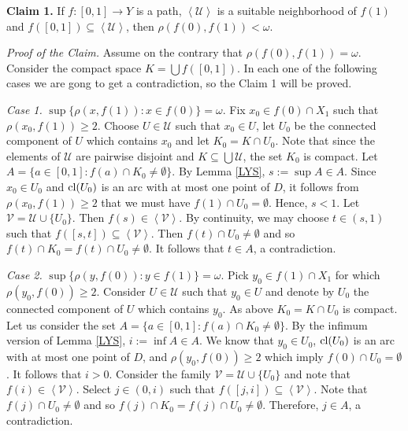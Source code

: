 \documentclass[11pt]{amsart}
\numberwithin{equation}{section}
\theoremstyle{plain}
\theoremstyle{definition}
\theoremstyle{definition}
\theoremstyle{definition}
\theoremstyle{definition}
\theoremstyle{definition}
\begin{document}
\textbf{Claim 1.} If $f : [0,1] \to Y$ is a path,  $\left\langle \mathcal{U}\right\rangle$ is a suitable neighborhood of $f(1)$ and $f([0,1]) \subseteq \left\langle \mathcal{U}\right\rangle$, then $\rho(f(0),f(1)) < \omega$.\medskip

\textit{Proof of the Claim.} Assume on the contrary that $\rho(f(0),f(1)) = \omega$. Consider the compact space  $K = \bigcup f([0,1])$.  In each one of the following cases we are gong to get a contradiction, so the Claim 1 will be proved.

\textit{Case 1.} $\sup\{\rho(x,f(1)) : x \in f(0)\} = \omega$. Fix $x_0 \in f(0) \cap X_1$ such that $\rho(x_0,f(1)) \geq 2$. Choose $U \in \mathcal{U}$ such that $x_0 \in U$, let $U_0$ be the connected component of $U$ which contains $x_0$ and let $K_0 = K \cap U_0$. Note that since the elements of $\mathcal{U}$ are pairwise  disjoint and $K \subseteq \bigcup \mathcal{U}$, the set $K_0$ is compact. Let $A = \{a \in [0,1] : f(a) \cap K_0 \not = \emptyset\}$. By Lemma \ref{LYS}, $s := \sup A \in A$. Since $x_0 \in U_0$ and $\textnormal{cl}(U_0)$ is an arc with at most one point of $D$, it follows from $\rho(x_0,f(1)) \geq 2$ that we must have $f(1) \cap U_0 = \emptyset$. Hence, $s < 1$. Let $\mathcal{V} = \mathcal{U} \cup \{U_0\}$. Then $f(s) \in \left\langle \mathcal{V}\right\rangle$. By continuity, we may choose $t \in (s,1)$ such that $f([s,t]) \subseteq \left\langle \mathcal{V}\right\rangle$. Then $f(t) \cap U_0 \not=\emptyset$ and so $f(t) \cap K_0 = f(t) \cap U_0 \not= \emptyset$. It follows that $t \in A$, a contradiction.

\smallskip

\textit{Case 2.} $\sup\{\rho(y,f(0)) : y \in f(1)\} = \omega$. Pick $y_0 \in f(1) \cap X_1$ for which $\rho(y_0,f(0)) \geq 2$. Consider $U \in \mathcal{U}$ such that $y_0 \in U$ and denote  by $U_0$ the connected component of $U$ which contains $y_0$. As above $K_0 = K \cap U_0$ is compact. Let us consider the set $A = \{a \in [0,1] : f(a) \cap K_0 \not = \emptyset\}$. By the infimum version of Lemma \ref{LYS}, $i := \inf A \in A$. We know that $y_0 \in U_0$, $\textnormal{cl}(U_0)$ is an arc with at most one point of $D$,  and $\rho(y_0,f(0)) \geq 2$ which imply $f(0) \cap U_0 = \emptyset$. It follows that $i > 0$. Consider the family $\mathcal{V} = \mathcal{U} \cup \{U_0\}$ and note that $f(i) \in \left\langle \mathcal{V}\right\rangle$. Select $j \in (0,i)$ such that $f([j,i]) \subseteq \left\langle \mathcal{V}\right\rangle$. Note that $f(j) \cap U_0 \not=\emptyset$ and so $f(j) \cap K_0 = f(j) \cap U_0 \not= \emptyset$. Therefore, $j \in A$, a contradiction.
\medskip
\end{document}
